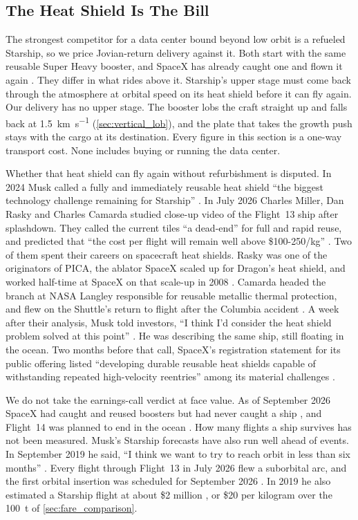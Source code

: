 \documentclass{article}
\begin{document}
\subsection{The Heat Shield Is The Bill}\label{sec:heat_shield_bill}
The strongest competitor for a data center bound beyond low orbit is a refueled Starship, so we price Jovian-return delivery against it. Both start with the same reusable Super Heavy booster, and SpaceX has already caught one and flown it again \cite{spacex2026_s1a}. They differ in what rides above it. Starship's upper stage must come back through the atmosphere at orbital speed on its heat shield before it can fly again. Our delivery has no upper stage. The booster lobs the craft straight up and falls back at \SI{1.5}{\kilo\meter\per\second} (\autoref{sec:vertical_lob}), and the plate that takes the growth push stays with the cargo at its destination. Every figure in this section is a one-way transport cost. None includes buying or running the data center.

Whether that heat shield can fly again without refurbishment is disputed. In 2024 Musk called a fully and immediately reusable heat shield ``the biggest technology challenge remaining for Starship'' \cite{musk2024_heatshield}. In July 2026 Charles Miller, Dan Rasky and Charles Camarda studied close-up video of the Flight~13 ship after splashdown. They called the current tiles ``a dead-end'' for full and rapid reuse, and predicted that ``the cost per flight will remain well above \$100-250/kg'' \cite{miller2026_tps}. Two of them spent their careers on spacecraft heat shields. Rasky was one of the originators of PICA, the ablator SpaceX scaled up for Dragon's heat shield, and worked half-time at SpaceX on that scale-up in 2008 \cite{nasa_spinoff2013_pica}. Camarda headed the branch at NASA Langley responsible for reusable metallic thermal protection, and flew on the Shuttle's return to flight after the Columbia accident \cite{nasa_camarda_bio}. A week after their analysis, Musk told investors, ``I think I'd consider the heat shield problem solved at this point'' \cite{spacex2026_q2_call}. He was describing the same ship, still floating in the ocean. Two months before that call, SpaceX's registration statement for its public offering listed ``developing durable reusable heat shields capable of withstanding repeated high-velocity reentries'' among its material challenges \cite{spacex2026_s1a}.

We do not take the earnings-call verdict at face value. As of September 2026 SpaceX had caught and reused boosters but had never caught a ship \cite{spacex2026_s1a,sparks2026_ship_catch}, and Flight~14 was planned to end in the ocean \cite{teslarati2026_flight14}. How many flights a ship survives has not been measured. Musk's Starship forecasts have also run well ahead of events. In September 2019 he said, ``I think we want to try to reach orbit in less than six months'' \cite{clark2019_starship_orbit}. Every flight through Flight~13 in July 2026 flew a suborbital arc, and the first orbital insertion was scheduled for September 2026 \cite{teslarati2026_flight14}. In 2019 he also estimated a Starship flight at about \$2 million \cite{spacex_starship_cost}, or \$20 per kilogram over the \SI{100}{\tonne} of \autoref{sec:fare_comparison}.
\end{document}
